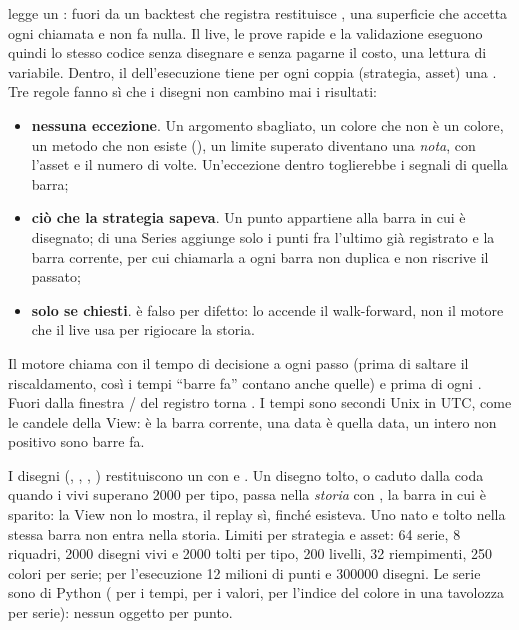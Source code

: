  legge un : fuori da un backtest che registra
restituisce , una superficie che accetta ogni chiamata e non fa
nulla. Il live, le prove rapide e la validazione eseguono quindi lo stesso
codice senza disegnare e senza pagarne il costo, una lettura di variabile.
Dentro, il  dell'esecuzione tiene per ogni coppia
(strategia, asset) una . Tre regole fanno sì che i disegni non
cambino mai i risultati:

\begin{itemize}
  \item \textbf{nessuna eccezione}. Un argomento sbagliato, un colore che non
    è un colore, un metodo che non esiste (), un
    limite superato diventano una \emph{nota}, con l'asset e il numero di
    volte. Un'eccezione dentro  toglierebbe i
    segnali di quella barra;
  \item \textbf{ciò che la strategia sapeva}. Un punto appartiene alla barra in
    cui è disegnato;  di una Series aggiunge solo i punti fra
    l'ultimo già registrato e la barra corrente, per cui chiamarla a ogni
    barra non duplica e non riscrive il passato;
  \item \textbf{solo se chiesti}.  è falso per
    difetto: lo accende il walk-forward, non il motore che il live usa per
    rigiocare la storia.
\end{itemize}

\noindent
Il motore chiama  con il tempo di decisione a ogni passo
(prima di saltare il riscaldamento, così i tempi \enquote{barre fa} contano
anche quelle) e  prima di ogni
. Fuori dalla finestra / del
registro  torna . I tempi sono secondi Unix in
UTC, come le candele della View:  è la barra corrente, una data è
quella data, un intero non positivo sono barre fa.

I disegni (, , , )
restituiscono un  con  e . Un
disegno tolto, o caduto dalla coda quando i vivi superano \num{2000} per tipo,
passa nella \emph{storia} con , la barra in cui è sparito: la View non
lo mostra, il replay sì, finché esisteva. Uno nato e tolto nella stessa barra
non entra nella storia. Limiti per strategia e asset: 64 serie, 8 riquadri,
\num{2000} disegni vivi e \num{2000} tolti per tipo, 200 livelli, 32
riempimenti, 250 colori per serie; per l'esecuzione 12 milioni di punti e
\num{300000} disegni. Le serie sono  di Python ( per i
tempi,  per i valori,  per l'indice del colore in una tavolozza
per serie): nessun oggetto per punto.


